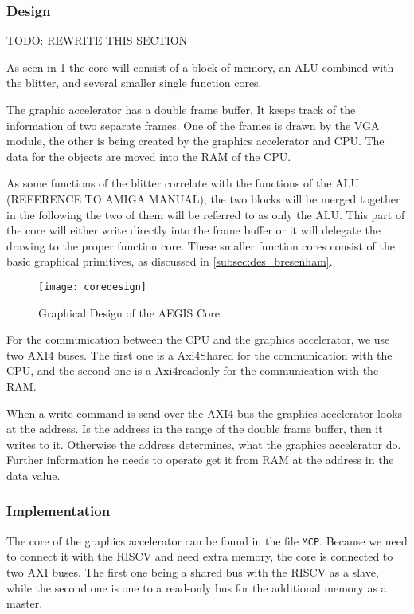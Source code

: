 \subsubsection*{Design}
TODO: REWRITE THIS SECTION

As seen in \cref{img:coredes} the core will consist of a block of memory, an ALU combined with the blitter, and several smaller single function cores.

The graphic accelerator has a double frame buffer. It keeps track of the information of two separate frames. One of the frames is drawn by the VGA module, the other is being created by the graphics accelerator and CPU. The data for the objects are moved into the RAM of the CPU.

As some functions of the blitter correlate with the functions of the ALU (REFERENCE TO AMIGA MANUAL), the two blocks will be merged together in the following the two of them will be referred to as only the ALU. This part of the core will either write directly into the frame buffer or it will delegate the drawing to the proper function core. These smaller function cores consist of the basic graphical primitives, as discussed in \cref{subsec:des_bresenham}.
\begin{figure}[H]
	\centering
	\texttt{[image: coredesign]}
	\caption{Graphical Design of the AEGIS Core }
	\label{img:coredes}
\end{figure}

For the communication between the CPU and the graphics accelerator, we use two AXI4 buses. The first one is a Axi4Shared for the communication with the CPU, and the second one is a Axi4readonly for the communication with the RAM.

When a write command is send over the AXI4 bus the graphics accelerator looks at the address. Is the address in the range of the double frame buffer, then it writes to it. Otherwise the address determines, what the graphics accelerator do. Further information he needs to operate get it from RAM at the address in the data value. 

\subsubsection*{Implementation}
The core of the graphics accelerator can be found in the file \texttt{MCP}. Because we need to connect it with the RISCV and need extra memory, the core is connected to two AXI buses. The first one being a shared bus with the RISCV as a slave, while the second one is one to a read-only bus for the additional memory as a master.

